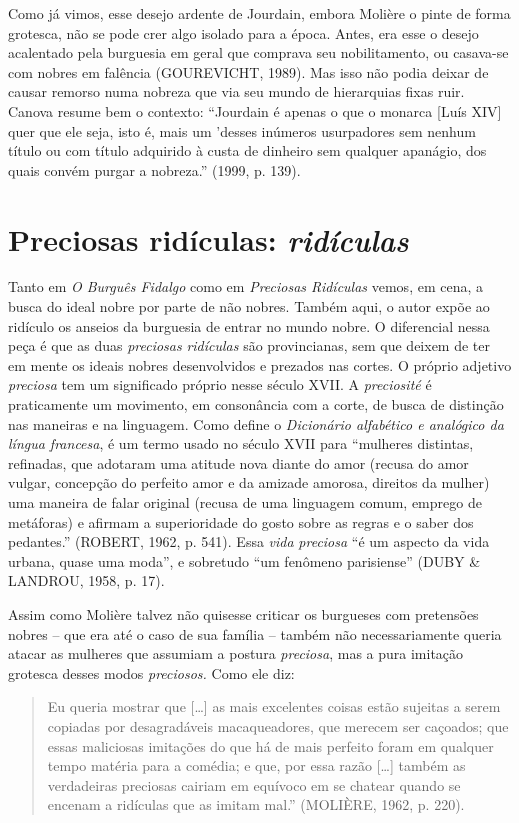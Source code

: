 Como já vimos, esse desejo ardente de Jourdain, embora Molière o pinte
de forma grotesca, não se pode crer algo isolado para a época. Antes,
era esse o desejo acalentado pela burguesia em geral que comprava seu
nobilitamento, ou casava-se com nobres em falência (GOUREVICHT, 1989).
Mas isso não podia deixar de causar remorso numa nobreza que via seu
mundo de hierarquias fixas ruir. Canova resume bem o contexto:
``Jourdain é apenas o que o monarca {[}Luís XIV{]} quer que ele seja,
isto é, mais um 'desses inúmeros usurpadores sem nenhum título ou com
título adquirido à custa de dinheiro sem qualquer apanágio, dos quais
convém purgar a nobreza.'' (1999, p. 139).

\section{Preciosas ridículas: \emph{ridículas}}

Tanto em \emph{O Burguês Fidalgo} como em \emph{Preciosas Ridículas}
vemos, em cena, a busca do ideal nobre por parte de não nobres. Também
aqui, o autor expõe ao ridículo os anseios da burguesia de entrar no
mundo nobre. O diferencial nessa peça é que as duas \emph{preciosas}
\emph{ridículas} são provincianas, sem que deixem de ter em mente os
ideais nobres desenvolvidos e prezados nas cortes. O próprio adjetivo
\emph{preciosa} tem um significado próprio nesse século XVII. A
\emph{preciosité} é praticamente um movimento, em consonância com a
corte, de busca de distinção nas maneiras e na linguagem. Como define o
\emph{Dicionário alfabético e analógico da língua francesa}, é um termo
usado no século XVII para ``mulheres distintas, refinadas, que adotaram
uma atitude nova diante do amor (recusa do amor vulgar, concepção do
perfeito amor e da amizade amorosa, direitos da mulher) uma maneira de
falar original (recusa de uma linguagem comum, emprego de metáforas) e
afirmam a superioridade do gosto sobre as regras e o saber dos
pedantes.'' (ROBERT, 1962, p. 541). Essa \emph{vida} \emph{preciosa} ``é
um aspecto da vida urbana, quase uma moda'', e sobretudo ``um fenômeno
parisiense'' (DUBY \& LANDROU, 1958, p. 17).

Assim como Molière talvez não quisesse criticar os burgueses com
pretensões nobres -- que era até o caso de sua família -- também não
necessariamente queria atacar as mulheres que assumiam a postura
\emph{preciosa}, mas a pura imitação grotesca desses modos
\emph{preciosos.} Como ele diz:

\begin{quote}
Eu queria mostrar que {[}\ldots{}{]} as mais excelentes coisas estão
sujeitas a serem copiadas por desagradáveis macaqueadores, que merecem
ser caçoados; que essas maliciosas imitações do que há de mais perfeito
foram em qualquer tempo matéria para a comédia; e que, por essa razão
{[}\ldots{}{]} também as verdadeiras preciosas cairiam em equívoco em se
chatear quando se encenam a ridículas que as imitam mal.'' (MOLIÈRE,
1962, p. 220).
\end{quote}

